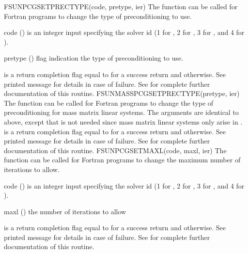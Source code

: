 {
  FSUNPCGSETPRECTYPE(code, pretype, ier)
}
{
  The function  can be called for Fortran
  programs to change the type of preconditioning to use.
}
{
  \begin{args}[pretype]
  \item[code] ()
    is an integer input specifying the solver id (1 for {\cvode}, 2
    for {\ida}, 3 for {\kinsol}, and 4 for {\arkode}).
  \item[pretype] ()
    flag indication the type of preconditioning to use.
  \end{args}
}
{
   is a  return completion flag equal to  for a success
  return and  otherwise. See printed message for details in case
  of failure.
}
{
  See  for complete further documentation of
  this routine.
}
{
  FSUNMASSPCGSETPRECTYPE(pretype, ier)
}
{
  The function  can be called for Fortran
  programs to change the type of preconditioning for mass matrix
  linear systems.
}
{
  The arguments are identical to  above,
  except that  is not needed since mass matrix linear systems
  only arise in {\arkode}.
}
{
   is a  return completion flag equal to  for a success
  return and  otherwise. See printed message for details in case
  of failure.
}
{
  See  for complete further documentation of
  this routine.
}
{
  FSUNPCGSETMAXL(code, maxl, ier)
}
{
  The function  can be called for Fortran
  programs to change the maximum number of iterations to allow.
}
{
  \begin{args}[maxl]
  \item[code] ()
    is an integer input specifying the solver id (1 for {\cvode}, 2
    for {\ida}, 3 for {\kinsol}, and 4 for {\arkode}).
  \item[maxl] ()
    the number of iterations to allow
  \end{args}
}
{
   is a  return completion flag equal to  for a success
  return and  otherwise. See printed message for details in case
  of failure.
}
{
  See  for complete further documentation of
  this routine.
}
